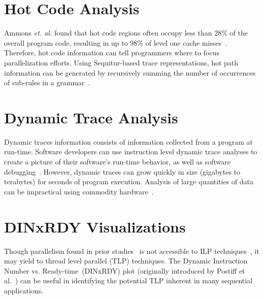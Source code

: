 \documentclass[defaultstyle,11pt]{thesis}
\begin{document}
\section{Hot Code Analysis}

Ammons \textit{et. al.} found that hot code regions often occupy less than 28\%
of the overall program code, resulting in up to 98\% of level one cache
misses~\cite{ammons:97:sigplan}.  Therefore, hot code information can
tell programmers where to focus parallelization efforts.  Using
Sequitur-based trace representations, hot path information can be
generated by recursively summing the number of occurrences of
sub-rules in a grammar~\cite{larus:99:pldi}.


\section{Dynamic Trace Analysis}
\label{sec:dynanalysis}

Dynamic traces information consists of information collected from a
program at run-time.  Software developers can use instruction level
dynamic trace analyses to create a picture of their software's
run-time behavior, as well as software
debugging~\cite{zhang:04:micro}.  However, dynamic traces can grow
quickly in size (gigabytes to terabytes) for seconds of program
execution. Analysis of large quantities of data can be impractical
using commodity hardware~\cite{reiss:01:icse}.

\section{DINxRDY Visualizations}
\label{sec:dinrdyplots}

Though parallelism found in prior studies~\cite{lam:92:isca,
  wall:93:decwrl, austin:92:isca} is not accessible to ILP
techniques~\cite{wall:93:decwrl}, it may yield to thread level
parallel (TLP) techniques.  The Dynamic Instruction Number
vs. Ready-time~(DINxRDY) plot (originally introduced by Postiff et
al.~\cite{postiff:98:um}) can be useful in identifying the potential
TLP inherent in many sequential applications.
\end{document}
